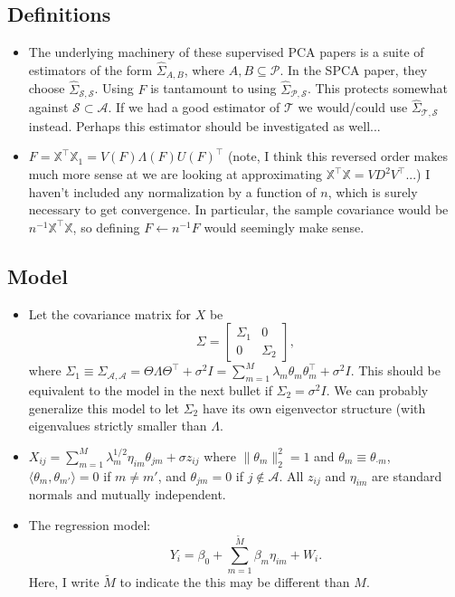 \documentclass[11pt]{article}
\newcommand{\norm}[1]{\lVert #1 \rVert}
\newcommand{\X}{\mathbb{X}}
\newcommand{\A}{\mathcal{A}}
\renewcommand{\S}{\mathcal{S}}
\newcommand{\T}{\mathcal{T}}
\newcommand{\PP}{\mathcal{P}}
\begin{document}
\subsection{Definitions}
\begin{itemize}
\item
The underlying machinery of these supervised PCA papers is a suite of estimators of the form $\hat\Sigma_{A,B}$, where $A,B \subseteq \PP$.  In the SPCA
paper, they choose $\hat\Sigma_{\S,\S}$.  Using $F$ is tantamount to using $\hat\Sigma_{\PP,\S}$.  This protects somewhat against $\S \subset \A$.  If we had a good estimator of $\T$
we would/could use $\hat\Sigma_{\T,\S}$ instead.  Perhaps this estimator should be investigated as well...

\item $F = \X^{\top}\X_1 = V(F) \Lambda(F) U(F)^{\top}$ (note, I think this reversed order makes much more sense at we are looking at approximating $\X^{\top}\X = VD^2V^{\top}$...)
I haven't included any normalization by a function of $n$, which is surely necessary to get convergence.  In particular, the sample covariance would be $n^{-1}\X^{\top}\X$,
so defining $F \leftarrow n^{-1}F$ would seemingly make sense.
\end{itemize}




\subsection{Model}
\begin{itemize}
\item 
Let the covariance matrix for $X$ be
\begin{equation}
\Sigma 
= 
 \begin{bmatrix} 
 \Sigma_{1} & 0  \\ 0 & \Sigma_2 
 \end{bmatrix},
\end{equation}
where $\Sigma_{1} \equiv \Sigma_{\A,\A} = \Theta \Lambda \Theta^{\top} + \sigma^2I = \sum_{m=1}^M \lambda_m \theta_m \theta_m^\top + \sigma^2 I$.  
This should be equivalent to the model in the next bullet if $\Sigma_2 = \sigma^2 I$.  We can probably generalize
this model to let $\Sigma_2$ have its own eigenvector structure (with eigenvalues strictly smaller than $\Lambda$.
\item
$
X_{ij} = \sum_{m=1}^M \lambda_m^{1/2}\eta_{im} \theta_{jm} + \sigma z_{ij}
$
where $\norm{\theta_{m}}_2^2 = 1$ and $\theta_{ m} \equiv \theta_{\cdot m}$, $\langle \theta_m, \theta_{m'} \rangle = 0$ if $m \neq m'$, and $\theta_{jm} = 0$ if $j \notin \A$.  All $z_{ij}$ and $\eta_{im}$ are standard normals and mutually independent.
\item The regression model: 
\begin{equation}
Y_i = \beta_0 + \sum_{m=1}^{\tilde{M}} \beta_m  \eta_{im} + W_i.
\label{eq:YregModel}
\end{equation}
Here, I write $\tilde{M}$ to indicate the this may be different than $M$.  
\end{itemize}
\end{document}
